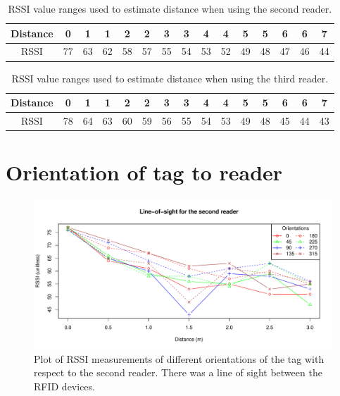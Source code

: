 \begin{table}[h]
	\centering
	\begin{tabular}{ | c | c | c || c | c || c | c || c | c || c | c || c | c || c | c | }
		\hline
		Distance 	& 0  & 1  & 1  & 2  & 2  & 3  & 3  & 4  & 4  & 5  & 5  & 6  & 6  & 7  \\ \hline
		RSSI 		& 77 & 63 & 62 & 58 & 57 & 55 & 54 &53  & 52 & 49 & 48 & 47 & 46 & 44 \\ \hline
	\end{tabular}
	\caption{RSSI value ranges used to estimate distance when using the second reader. }
	\label{tbl:trans2}
\end{table}

\begin{table}[h]
	\centering
	\begin{tabular}{ | c | c | c || c | c || c | c || c | c || c | c || c | c || c | c | }
		\hline
		Distance 	& 0  & 1  & 1  & 2  & 2  & 3  & 3  & 4  & 4  & 5  & 5  & 6  & 6  & 7  \\ \hline
		RSSI 		& 78 & 64 & 63 & 60 & 59 & 56 & 55 & 54 & 53 & 49 & 48 & 45 & 44 & 43 \\ \hline
	\end{tabular}
	\caption{RSSI value ranges used to estimate distance when using the third reader. }
	\label{tbl:trans3}
\end{table}

\newpage
\section{Orientation of tag to reader}
\label{sec:oriap}

\begin{figure}[H]
	\begin{center}
		\includegraphics[width=1\textwidth]{figures/rssi_distance_3m_los_r2}
		\caption{Plot of RSSI measurements of different orientations of the tag with respect to the second reader. There was  a line of sight between the RFID devices.}
	\end{center}
\end{figure}

